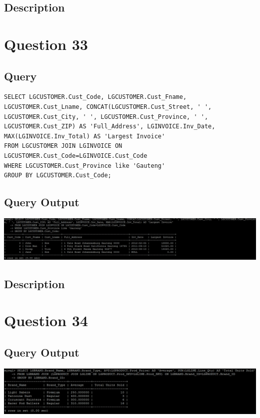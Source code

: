 \documentclass[a4paper,10pt]{article}
\begin{document}
\subsection{Description}
\section*{Question 33}
 \subsection{Query}
          \lstset{
            language=SQL,
            breaklines=true
            }
        \begin{lstlisting}[frame=single]
        SELECT LGCUSTOMER.Cust_Code, LGCUSTOMER.Cust_Fname, LGCUSTOMER.Cust_Lname, CONCAT(LGCUSTOMER.Cust_Street, ' ', LGCUSTOMER.Cust_City, ' ', LGCUSTOMER.Cust_Province, ' ', LGCUSTOMER.Cust_ZIP) AS 'Full_Address', LGINVOICE.Inv_Date, MAX(LGINVOICE.Inv_Total) AS 'Largest Invoice'
FROM LGCUSTOMER JOIN LGINVOICE ON LGCUSTOMER.Cust_Code=LGINVOICE.Cust_Code
WHERE LGCUSTOMER.Cust_Province like 'Gauteng'
GROUP BY LGCUSTOMER.Cust_Code;

        \end{lstlisting}
\subsection{Query Output}
           \includegraphics{Queries/Question_33/Q33_screenshot.jpg}
\subsection{Description}
\section*{Question 34}
\subsection{Query Output}
           \includegraphics{Queries/Question_34/Q34_screenshot.jpg}
\end{document}
